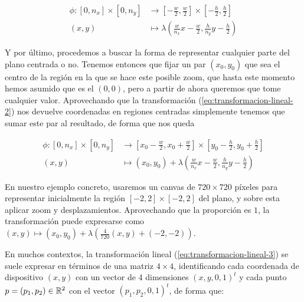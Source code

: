 \begin{equation}
    \label{eq:transformacion-lineal-2}
    \begin{split}
        \phi:[0,n_x]\times[0,n_y] & \longrightarrow \left[-\frac{w}{2},\frac{w}{2}\right]\times\left[-\frac{h}{2},\frac{h}{2}\right] \\
        (x,y) & \longmapsto \lambda\left(\frac{w}{n_x}x-\frac{w}{2},\frac{h}{n_y}y-\frac{h}{2}\right)
    \end{split}
\end{equation}

Y por último, procedemos a buscar la forma de representar cualquier parte del plano centrada o no. Tenemos entonces que fijar un par $(x_0,y_0)$ que sea el centro de la región en la que se hace este posible zoom, que hasta este momento hemos asumido que es el $(0,0)$, pero a partir de ahora queremos que tome cualquier valor. Aprovechando que la transformación (\ref{eq:transformacion-lineal-2}) nos devuelve coordenadas en regiones centradas simplemente tenemos que sumar este par al resultado, de forma que nos queda 

\begin{equation}
    \label{eq:transformacion-lineal-3}
    \begin{split}
        \phi:[0,n_x]\times[0,n_y] & \longrightarrow \left[x_0-\frac{w}{2},x_0+\frac{w}{2}\right]\times\left[y_0-\frac{h}{2},y_0+\frac{h}{2}\right] \\
        (x,y) & \longmapsto (x_0,y_0) + \lambda\left(\frac{w}{n_x}x-\frac{w}{2},\frac{h}{n_y}y-\frac{h}{2}\right)
    \end{split}
\end{equation}

En nuestro ejemplo concreto, usaremos un canvas de $720\times 720$ píxeles para representar inicialmente la región $[-2,2]\times[-2,2]$ del plano, y sobre esta aplicar zoom y desplazamientos. Aprovechando que la proporción es $1$, la transformación puede expresarse como $(x,y)\longmapsto(x_0,y_0)+\lambda\left(\frac{4}{720}(x,y) + (-2,-2)\right)$.

En muchos contextos, la transformación lineal (\ref{eq:transformacion-lineal-3}) se suele expresar en términos de una matriz $4\times 4$, identificando cada coordenada de dispositivo $(x,y)$ con un vector de 4 dimensiones $(x,y,0,1)^t$ y cada punto $p=(p_1,p_2)\in\mathbb{R}^2$ con el vector $(p_1, p_2, 0 ,1)^t$, de forma que:

